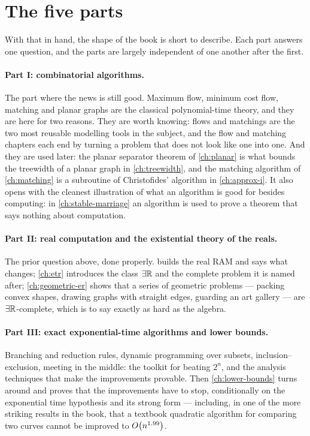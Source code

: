 \section{The five parts}
\label{sec:intro-map}

With that in hand, the shape of the book is short to describe. Each part
answers one question, and the parts are largely independent of one another
after the first.

\paragraph{Part I: combinatorial algorithms.}
The part where the news is still good. Maximum flow, minimum cost flow,
matching and planar graphs are the classical polynomial-time theory, and they
are here for two reasons. They are worth knowing: flows and matchings are the
two most reusable modelling tools in the subject, and the flow and matching
chapters each end by turning a problem that does not look like one into one. And they are used later: the planar separator theorem of
\cref{ch:planar} is what bounds the treewidth of a planar graph in
\cref{ch:treewidth}, and the matching algorithm of \cref{ch:matching} is a
subroutine of Christofides' algorithm in \cref{ch:approx-i}. It also opens with
the cleanest illustration of what an algorithm is good for besides computing:
in \cref{ch:stable-marriage} an algorithm is used to prove a theorem that says
nothing about computation.

\paragraph{Part II: real computation and the existential theory of the reals.}
The prior question above, done properly.  builds the real
RAM and says what changes; \cref{ch:etr} introduces the class $\exists\mathbb{R}$ and the
complete problem it is named after; \cref{ch:geometric-er} shows that a series
of geometric problems --- packing convex shapes, drawing graphs with straight
edges, guarding an art gallery --- are $\exists\mathbb{R}$-complete, which is to say exactly
as hard as the algebra.

\paragraph{Part III: exact exponential-time algorithms and lower bounds.}
Branching and reduction rules, dynamic programming over subsets,
inclusion--exclusion, meeting in the middle: the toolkit for beating $2^n$, and
the analysis techniques that make the improvements provable. Then
\cref{ch:lower-bounds} turns around and proves that the improvements have to
stop, conditionally on the exponential time hypothesis and its strong form ---
including, in one of the more striking results in the book, that a textbook
quadratic algorithm for comparing two curves cannot be improved to
$O\!\left(n^{1.99}\right)$.

